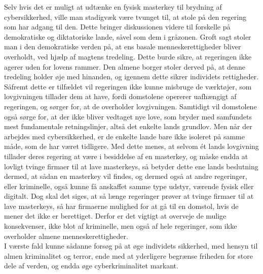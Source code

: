 \noindent
Selv hvis det er muligt at udtænke en fysisk masterkey til brydning af cybersikkerhed, ville man stadigvæk være tvunget til, at stole på den regering som har adgang til den. Dette bringer diskussionen videre til forskelle på demokratiske og diktatoriske lande, såvel som dem i gråzonen. Groft sagt stoler man i den demokratiske verden på, at ens basale menneskerettigheder bliver overholdt, ved hjælp af magtens tredeling. Dette burde sikre, at regeringen ikke agerer uden for lovens rammer. Den almene borger stoler derved på, at denne tredeling holder øje med hinanden, og igennem dette sikrer individets rettigheder. Såfremt dette er tilfældet vil regeringen ikke kunne misbruge de værktøjer, som lovgivningen tillader dem at have, fordi domstolene opererer uafhængigt af regeringen, og sørger for, at de overholder lovgivningen. Samtidigt vil domstolene også sørge for, at der ikke bliver vedtaget nye love, som bryder med samfundets mest fundamentale retningslinjer, altså det enkelte lands grundlov. Men når der arbejdes med cybersikkerhed, er de enkelte lande bare ikke isoleret på samme måde, som de har været tidligere. Med dette menes, at selvom ét lands lovgivning tillader deres regering at være i besiddelse af en masterkey, og måske endda at lovligt tvinge firmaer til at lave masterkeys, så betyder dette ene lands beslutning dermed, at sådan en masterkey vil findes, og dermed også at andre regeringer, eller kriminelle, også kunne få anskaffet samme type udstyr, værende fysisk eller digitalt. Dog skal det siges, at så længe regeringer prøver at tvinge firmaer til at lave masterkeys, så har firmaerne mulighed for at gå til en domstol, hvis de mener det ikke er berettiget. Derfor er det vigtigt at overveje de mulige konsekvenser, ikke blot af kriminelle, men også af hele regeringer, som ikke overholder almene menneskerettigheder.\\
\noindent
I værste fald kunne sådanne forsøg på at øge individets sikkerhed, med hensyn til almen kriminalitet og terror, ende med at yderligere begrænse friheden for store dele af verden, og endda øge cyberkriminalitet markant.